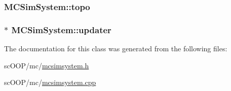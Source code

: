 \hypertarget{class_m_c_sim_system_a27d68360d188e564c5b0e8991e63671c}{
\subsubsection[{topo}]{ M\+C\+Sim\+System\+::topo\hspace{0.3cm}{\ttfamily [private]}}}\label{class_m_c_sim_system_a27d68360d188e564c5b0e8991e63671c}
\hypertarget{class_m_c_sim_system_af7c8b2a6f211b0c6f8adc3f773f775f7}{
\subsubsection[{updater}]{$\ast$ M\+C\+Sim\+System\+::updater\hspace{0.3cm}{\ttfamily [private]}}}\label{class_m_c_sim_system_af7c8b2a6f211b0c6f8adc3f773f775f7}


The documentation for this class was generated from the following files\+:\begin{DoxyCompactItemize}
\item 
sc\+O\+O\+P/mc/\hyperlink{mcsimsystem_8h}{mcsimsystem.\+h}\item 
sc\+O\+O\+P/mc/\hyperlink{mcsimsystem_8cpp}{mcsimsystem.\+cpp}\end{DoxyCompactItemize}

